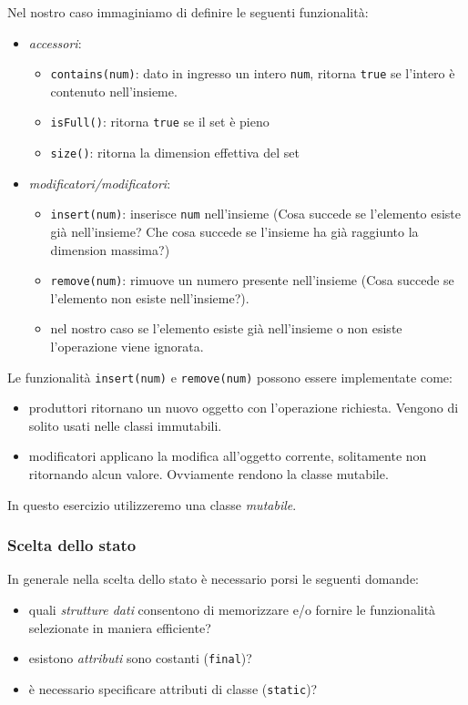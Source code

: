 \documentclass{article}
\begin{document}
Nel nostro caso immaginiamo di definire le seguenti funzionalit\`a:
\begin{itemize}
\item \emph{accessori}:
\begin{itemize}
\item \texttt{contains(num)}: dato in ingresso un intero \texttt{num}, ritorna \texttt{true} se l'intero è contenuto nell'insieme.
\item \texttt{isFull()}: ritorna \texttt{true} se il set \`e pieno
\item \texttt{size()}: ritorna la dimension effettiva del set
\end{itemize}
\item \emph{modificatori/modificatori}:
\begin{itemize}
\item  \texttt{insert(num)}: inserisce \texttt{num} nell'insieme (Cosa succede se l'elemento esiste gi\`a nell'insieme?
Che cosa succede se l'insieme ha gi\`a raggiunto la dimension massima?)
\item \texttt{remove(num)}: rimuove un numero presente nell'insieme (Cosa succede se l'elemento non esiste  nell'insieme?).
\item nel nostro caso se l'elemento esiste gi\`a nell'insieme o non esiste l'operazione viene  ignorata.
\end{itemize}
\end{itemize}


Le funzionalit\`a \texttt{insert(num)} e \texttt{remove(num)} possono essere implementate come:
\begin{itemize}
	\item produttori ritornano un nuovo oggetto con l'operazione richiesta. Vengono di solito usati nelle classi immutabili.
	\item modificatori applicano la modifica all'oggetto corrente, solitamente non ritornando alcun valore. Ovviamente rendono la classe mutabile.
\end{itemize}
In questo esercizio utilizzeremo una classe \emph{mutabile}.

\subsubsection{Scelta dello stato}
In generale nella scelta dello stato \`e necessario porsi le seguenti domande:
\begin{itemize}
\item quali \emph{strutture dati} consentono di memorizzare e/o fornire le funzionalit\`a selezionate in maniera efficiente?
\item esistono \emph{attributi} sono costanti (\texttt{final})?
\item \`e necessario specificare attributi di classe (\texttt{static})?
\end{itemize}
\end{document}
